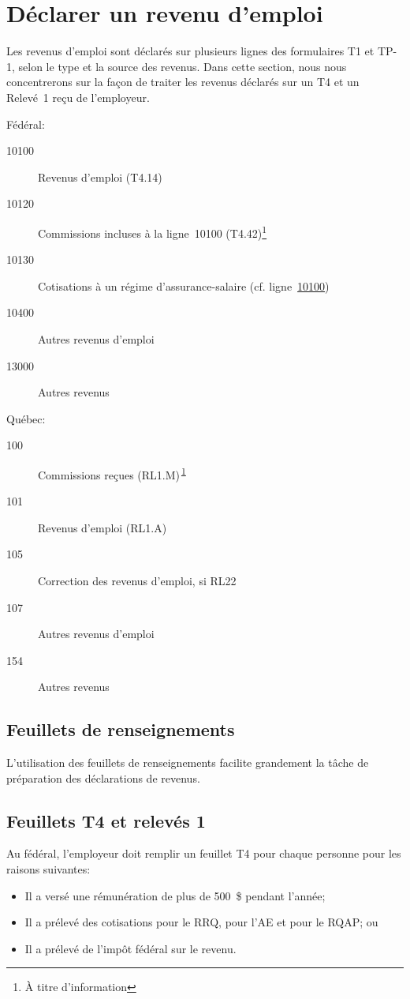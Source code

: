 \section{Déclarer un revenu d'emploi}
\begin{intro}
	Les revenus d'emploi sont déclarés sur plusieurs lignes des formulaires T1 et TP-1, selon le type et la source des revenus. Dans cette section, nous nous concentrerons sur la façon de traiter les revenus déclarés sur un T4 et un Relevé~1 reçu de l'employeur.
\end{intro}
Fédéral:
\ca
\begin{description}
	\item[10100] Revenus d'emploi (T4.14)
	\item[10120] Commissions incluses à la ligne~10100 (T4.42)\footnote{\label{ATitreDInformation}À titre d'information}
	\item[10130] Cotisations à un régime d'assurance-salaire (cf. ligne~\href{https://www.canada.ca/fr/agence-revenu/services/impot/particuliers/sujets/tout-votre-declaration-revenus/declaration-revenus/remplir-declaration-revenus/revenu-personnel/ligne-10100-revenus-emploi.html}{10100})
	\item[10400] Autres revenus d'emploi
	\item[13000] Autres revenus
\end{description}

Québec:
\qc
\begin{description}
	\item[100] Commissions reçues (RL1.M)\textsuperscript{\,\ref{ATitreDInformation}}
	\item[101] Revenus d'emploi (RL1.A)
	\item[105] Correction des revenus d'emploi, si RL22
	\item[107] Autres revenus d'emploi
	\item[154] Autres revenus
\end{description}


\subsection{Feuillets de renseignements}
L'utilisation des feuillets de renseignements facilite grandement la tâche de préparation des déclarations de revenus.


\subsection{Feuillets T4 et relevés 1}
\ca
Au fédéral, l'employeur doit remplir un feuillet T4 pour chaque personne pour les raisons suivantes:
\begin{itemize}
	\item Il a versé une rémunération de plus de 500~\$ pendant l'année;
	\item Il a prélevé des cotisations pour le RRQ, pour l'AE et pour le RQAP; ou
	\item Il a prélevé de l'impôt fédéral sur le revenu.
\end{itemize}

